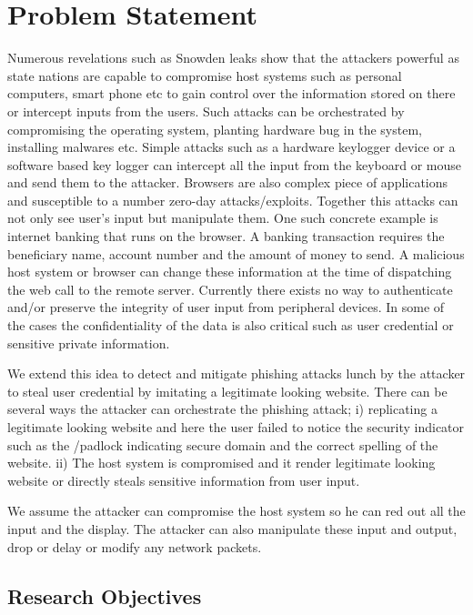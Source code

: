 \section{Problem Statement}
\label{sec:problemStatement}

Numerous revelations such as Snowden leaks show that the attackers powerful as state nations are capable to compromise host systems such as personal computers, smart phone etc to gain control over the information stored on there or intercept inputs from the users. Such attacks can be orchestrated by compromising the operating system, planting hardware bug in the system, installing malwares etc. Simple attacks such as a hardware keylogger device or a software based key logger can intercept all the input from the keyboard or mouse and send them to the attacker. Browsers are also complex piece of applications and susceptible to a number zero-day attacks/exploits. Together this attacks can not only see user's input but manipulate them. One such concrete example is internet banking that runs on the browser. A banking transaction requires the beneficiary name, account number and the amount of money to send. A malicious host system or browser can change these information at the time of dispatching the web call to the remote server. Currently there exists no way to authenticate and/or preserve the integrity of user input from peripheral devices. In some of the cases the confidentiality of the data is also critical such as user credential or sensitive private information.

We extend this idea to detect and mitigate phishing attacks lunch by the attacker to steal user credential by imitating a legitimate looking website. There can be several ways the attacker can orchestrate the phishing attack; i) replicating a legitimate looking website and here the user failed to notice the security indicator such as the \ssl/\tls padlock indicating secure domain and the correct spelling of the website. ii) The host system is compromised and it render legitimate looking website or directly steals sensitive information from user input.

We assume the attacker can compromise the host system so he can red out all the input and the display. The attacker can also manipulate these input and output, drop or delay or modify any network packets.


\subsection{Research Objectives}

